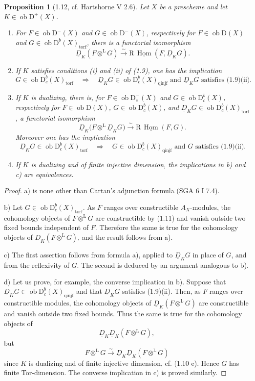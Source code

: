 \documentclass[11pt,a4paper]{article}
\newcommand{\D}{\mathrm{D}}
\newcommand{\ob}{\operatorname{ob}}
\DeclareMathOperator{\Hom}{Hom}
\newcommand{\RHom}{\mathrm{R}\,\underline{\Hom}}
\newcommand{\Ddual}{\underline{D}}
\theoremstyle{plain}
\newtheorem*{propositionstar}{Proposition}
\theoremstyle{definition}
\begin{document}
\begin{propositionstar}[1.12, cf. Hartshorne V 2.6]
Let $X$ be a prescheme and let $K\in\ob\D^+(X)$.
\begin{enumerate}[label=\alph*)]
\item For $F\in\ob\D^-(X)$ and $G\in\ob\D^-(X)$, respectively for $F\in\ob\D(X)$ and $G\in\ob\D^b(X)_{\mathrm{torf}}$, there is a functorial isomorphism
\[
\Ddual_K(F\otimes^{\mathrm L}G)\xrightarrow{\sim}\RHom(F,\Ddual_KG).
\]
\item If $K$ satisfies conditions (i) and (ii) of (1.9), one has the implication
\[
G\in\ob\D_c^b(X)_{\mathrm{torf}}
\quad\Longrightarrow\quad
\Ddual_KG\in\ob\D_c^b(X)_{\mathrm{qinjf}}\text{ and }\Ddual_KG\text{ satisfies (1.9)(ii).}
\]
\item If $K$ is dualizing, there is, for $F\in\ob\D_c^-(X)$ and $G\in\ob\D_c^b(X)$, respectively for $F\in\ob\D(X)$, $G\in\ob\D_c^b(X)$, and $\Ddual_KG\in\ob\D_c^b(X)_{\mathrm{torf}}$, a functorial isomorphism
\[
\Ddual_K\bigl(F\otimes^{\mathrm L}\Ddual_KG\bigr)\xrightarrow{\sim}\RHom(F,G).
\]
Moreover one has the implication
\[
\Ddual_KG\in\ob\D_c^b(X)_{\mathrm{torf}}
\quad\Longrightarrow\quad
G\in\ob\D_c^b(X)_{\mathrm{qinjf}}\text{ and }G\text{ satisfies (1.9)(ii).}
\]
\item If $K$ is dualizing and of finite injective dimension, the implications in b) and c) are equivalences.
\end{enumerate}
\end{propositionstar}

\begin{proof}
a) is none other than Cartan's adjunction formula (SGA 6 I 7.4).

b) Let $G\in\ob\D_c^b(X)_{\mathrm{torf}}$. As $F$ ranges over constructible $A_X$-modules, the cohomology objects of $F\otimes^{\mathrm L}G$ are constructible by (1.11) and vanish outside two fixed bounds independent of $F$. Therefore the same is true for the cohomology objects of $\Ddual_K(F\otimes^{\mathrm L}G)$, and the result follows from a).

c) The first assertion follows from formula a), applied to $\Ddual_KG$ in place of $G$, and from the reflexivity of $G$. The second is deduced by an argument analogous to b).

d) Let us prove, for example, the converse implication in b). Suppose that $\Ddual_KG\in\ob\D_c^b(X)_{\mathrm{qinjf}}$ and that $\Ddual_KG$ satisfies (1.9)(ii). Then, as $F$ ranges over constructible modules, the cohomology objects of $\Ddual_K(F\otimes^{\mathrm L}G)$ are constructible and vanish outside two fixed bounds. Thus the same is true for the cohomology objects of
\[
\Ddual_K\Ddual_K(F\otimes^{\mathrm L}G),
\]
but
\[
F\otimes^{\mathrm L}G\xrightarrow{\sim}\Ddual_K\Ddual_K(F\otimes^{\mathrm L}G)
\]
since $K$ is dualizing and of finite injective dimension, cf. (1.10 e). Hence $G$ has finite Tor-dimension. The converse implication in c) is proved similarly.
\end{proof}
\end{document}
